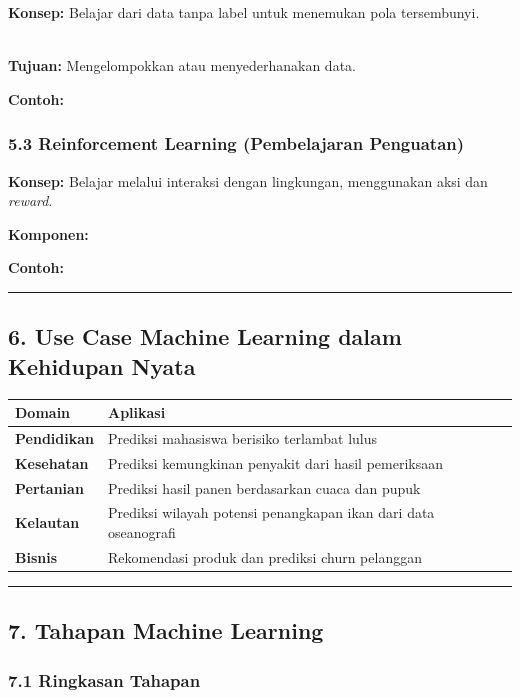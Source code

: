 \documentclass[12pt,a4paper]{article}
\begin{document}
\textbf{Konsep:} Belajar dari data tanpa label untuk menemukan pola tersembunyi.


\\[
X \rightarrow \text{Model} \rightarrow \text{Pola / Cluster}
\\]


\textbf{Tujuan:} Mengelompokkan atau menyederhanakan data.


\textbf{Contoh:}


\subsubsection{5.3 Reinforcement Learning (Pembelajaran Penguatan)}

\textbf{Konsep:} Belajar melalui interaksi dengan lingkungan, menggunakan aksi dan \emph{reward}.


\textbf{Komponen:}


\textbf{Contoh:}


\hrule


\subsection{6. Use Case Machine Learning dalam Kehidupan Nyata}

\begin{tabular}{|l|l|}
\hline
Domain & Aplikasi \\
\hline
\textbf{Pendidikan} & Prediksi mahasiswa berisiko terlambat lulus \\
\hline
\textbf{Kesehatan} & Prediksi kemungkinan penyakit dari hasil pemeriksaan \\
\hline
\textbf{Pertanian} & Prediksi hasil panen berdasarkan cuaca dan pupuk \\
\hline
\textbf{Kelautan} & Prediksi wilayah potensi penangkapan ikan dari data oseanografi \\
\hline
\textbf{Bisnis} & Rekomendasi produk dan prediksi churn pelanggan \\
\hline
\end{tabular}


\hrule


\subsection{7. Tahapan Machine Learning}

\subsubsection{7.1 Ringkasan Tahapan}
\end{document}
